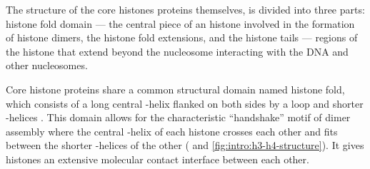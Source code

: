       The structure of the core histones proteins themselves, is divided
      into three parts: histone fold domain --- the central piece of an
      histone involved in the formation of histone dimers, the histone
      fold extensions, and the histone tails --- regions of the histone
      that extend beyond the nucleosome interacting with the DNA and
      other nucleosomes.

      Core histone proteins share a common structural domain named
      histone fold, which consists of a long central
      \textalpha-helix flanked on both sides by a loop
      and shorter \textalpha-helices \citep{arents1991-31angstrom, arents1995histone-fold}.
      This domain allows for the characteristic ``handshake'' motif
      of dimer assembly where the central \textalpha-helix of each
      histone crosses each other and fits between the shorter
      \textalpha-helices of the other (
      and \ref{fig:intro:h3-h4-structure}).
      It gives histones an extensive molecular contact interface
      between each other.

